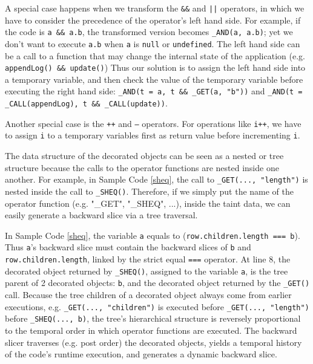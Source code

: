 A special case happens when we transform the {\tt \&\&} and {\tt |}{\tt |} operators, in which we have to consider the precedence of the operator's left hand side.   
For example, if the code is {\tt a \&\& a.b}, the transformed version becomes {\tt \_AND(a, a.b)}; yet we don't want to execute {\tt a.b} when {\tt a} is {\tt null} or {\tt undefined}.  
The left hand side can be a call to a function that may change the internal state of the application (e.g. {\tt appendLog() \&\& update()})
Thus our solution is to assign the left hand side into a temporary variable, and then check the value of the temporary variable before executing the right hand side: {\tt \_AND(t = a, t \&\& \_GET(a, "b"))} and {\tt \_AND(t = \_CALL(appendLog), t \&\& \_CALL(update))}.  

Another special case is the {\tt ++} and {\tt --} operators.  For operations like {\tt i++}, we have to assign {\tt i} to a temporary variables first as return value before incrementing {\tt i}.


The data structure of the decorated objects can be seen as a nested or tree structure because the calls to the operator functions are nested inside one another.  For example, in Sample Code \ref{sheq}, the call to {\tt \_GET(..., "length")} is nested inside the call to {\tt \_SHEQ()}.  
Therefore, if we simply put the name of the operator function (e.g. "\_GET", "\_SHEQ", ...), inside the taint data, we can easily generate a backward slice via a tree traversal.  

In Sample Code \ref{sheq}, the variable {\tt a} equals to ({\tt row.children.length === b}).  Thus {\tt a}'s backward slice must contain the backward slices of {\tt b} and {\tt row.children.length}, linked by the strict equal {\tt ===} operator.  
At line 8, the decorated object returned by {\tt \_SHEQ()}, assigned to the variable {\tt a}, is the tree parent of 2 decorated objects: {\tt b}, and the decorated object returned by the {\tt \_GET()} call.  
Because the tree children of a decorated object always come from earlier executions, e.g. {\tt \_GET(..., "children")} is executed before {\tt \_GET(..., "length")} before {\tt \_SHEQ(..., b)}, the tree's hierarchical structure is reversely proportional to the temporal order in which operator functions are executed.  
The backward slicer traverses (e.g. post order) the decorated objects, yields a temporal history of the code's runtime execution, and generates a dynamic backward slice.  

